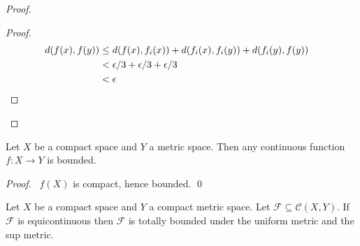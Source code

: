 \begin{proof}
  \pf
  \begin{proof}
    \pf
    \begin{align*}
      d(f(x), f(y)) & \leq d(f(x), f_i(x)) + d(f_i(x), f_i(y)) + d(f_i(y), f(y)) \\
      & < \epsilon / 3 + \epsilon / 3 + \epsilon / 3 \\
      & < \epsilon & \qed
    \end{align*}
  \end{proof}
\end{proof}

\begin{lm}
  Let $X$ be a compact space and $Y$ a metric space. Then any continuous function $f : X \rightarrow Y$ is bounded.
\end{lm}

\begin{proof}
  \pf\ $f(X)$ is compact, hence bounded. \qed
\end{proof}

\begin{lm}
  \label{metric:equicontinuous_totally_bounded}
  Let $X$ be a compact space and $Y$ a compact metric space. Let $\mathcal{F} \subseteq \mathcal{C}(X, Y)$. If $\mathcal{F}$ is equicontinuous then $\mathcal{F}$ is totally bounded under the uniform metric and the sup metric.
\end{lm}

